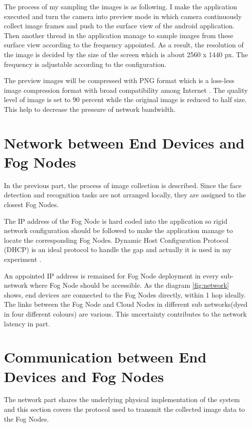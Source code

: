 The process of my sampling the images is as following. I make the application executed and turn the camera into preview mode in which camera continuously collect image frames and push to the surface view of the android application. Then another thread in the application manage to sample images from these surface view according to the frequency appointed. As a result, the resolution of the image is decided by the size of the screen which is about 2560 x 1440 px. The frequency is adjustable according to the configuration.

The preview images will be compressed with PNG format\cite{roelofs1999png} which is a loss-less image compression format with  broad compatibility among Internet . The quality level of image is set to 90 percent while the original image is reduced to half size. This help to decrease the pressure of network bandwidth.

\section{Network between End Devices and Fog Nodes}
In the previous part, the process of image collection is described. Since the face detection and recognition tasks are not arranged locally, they are assigned to the closest Fog Nodes.

The IP address of the Fog Node is hard coded into the application so rigid network configuration should be followed to make the application manage to locate the corresponding Fog Nodes. Dynamic Host Configuration Protocol (DHCP)\cite{droms2002dhcp} is an ideal protocol to handle the gap and actually it is used in my experiment .

An appointed IP address is remained for Fog Node deployment in every sub-network where Fog Node should be accessible. As the diagram \ref{fig:network} shows, end devices are connected to the Fog Nodes directly, within 1 hop ideally. The links between the Fog Node and Cloud Nodes in different sub networks(dyed in four different colours) are various. This uncertainty contributes to the network latency in part.

\section{Communication between End Devices and Fog Nodes}
The network part shares the underlying physical implementation of the system and this section covers the protocol used to transmit the collected image data to the Fog Nodes.

